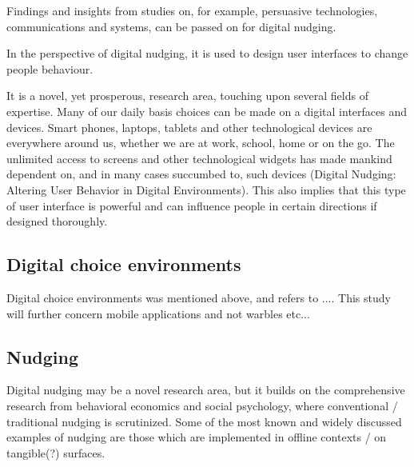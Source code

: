 {Findings and insights from studies on, for example, persuasive technologies, communications and systems, can be passed on for digital nudging.

In the perspective of digital nudging, it is used to design user interfaces to change people behaviour. 

It is a novel, yet prosperous, research area, touching upon several fields of expertise. Many of our daily basis choices can be made on a digital interfaces and devices. Smart phones, laptops, tablets and other technological devices are everywhere around us, whether we are at work, school, home or on the go. The unlimited access to screens and other technological widgets has made mankind dependent on, and in many cases succumbed to, such devices (Digital Nudging: Altering User Behavior in Digital Environments). This also implies that this type of user interface is powerful and can influence people in certain directions if designed thoroughly. %

\subsection{Digital choice environments}
Digital choice environments was mentioned above, and refers to .... 
This study will further concern mobile applications and not warbles etc... 

\subsection{Nudging}

Digital nudging may be a novel research area, but it builds on the comprehensive research from behavioral economics and social psychology, where conventional / traditional nudging is scrutinized. Some of the most known and widely discussed examples of nudging are those which are implemented in offline contexts / on tangible(?) surfaces. 


}
